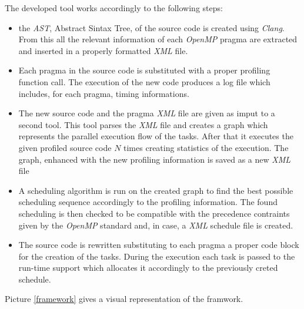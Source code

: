 \documentclass[a4paper,11pt,oneside]{book}
\begin{document}
The developed tool works accordingly to the following steps:
\begin{itemize}
\item{the \emph{AST}, Abstract Sintax Tree, of the source code is created using \emph{Clang}. From this all the relevant information of each \emph{OpenMP} pragma are extracted and inserted in a properly formatted \emph{XML} file.}
\item{Each pragma in the source code is substituted with a proper profiling function call. The execution of the new code produces a log file which includes, for each pragma, timing informations.  }
\item{The new source code and the pragma \emph{XML} file are given as imput to a second tool. This tool parses the \emph{XML} file and creates a graph which represents the parallel execution flow of the tasks. After that it executes the given profiled source code $N$ times creating statistics of the execution. The graph, enhanced with the new profiling information is saved as a new \emph{XML} file}
\item{ A scheduling algorithm is run on the created graph to find the best possible scheduling sequence accordingly to the profiling information. The found scheduling is then checked to be compatible with the precedence contraints given by the \emph{OpenMP} standard and, in case, a \emph{XML} schedule file is created.}
\item{ The source code is rewritten substituting to each pragma a proper code block for the creation of the tasks. During the execution each task is passed to the run-time support which allocates it accordingly to the previously creted schedule.}
\end{itemize}

Picture \ref{framework} gives a visual representation of the framwork.
\end{document}
